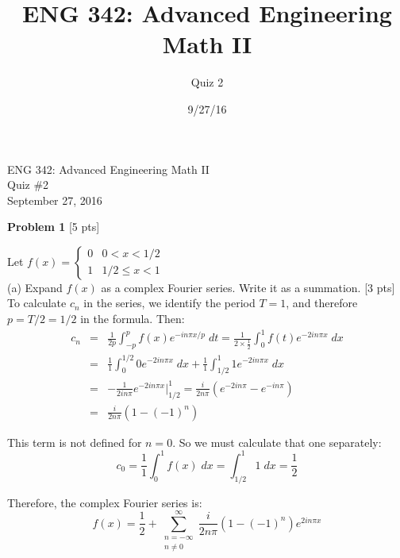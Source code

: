 \documentclass[11pt]{article}
\begin{document}
\title{ENG 342: Advanced Engineering Math II}
\author{Quiz 2}
\date{9/27/16}

{\Large ENG 342: Advanced Engineering Math II} \\

{\large Quiz \#2} \\

September 27, 2016 \\

\newpage

\textbf{Problem 1} [5 pts]

\vspace{0.1in}

Let $f(x) = \begin{cases} 0 & 0 < x <  1/2 \\  1 & 1/2 \leq x < 1 \end{cases}$ \\

(a) Expand $f(x)$ as a complex Fourier series. Write it as a summation. [3 pts] \\

To calculate $c_n$ in the series, we identify the period $T = 1$, and therefore $p = T/2 = 1/2$ in the formula. Then:
\begin{eqnarray*}
c_n &=& \frac{1}{2p} \int_{-p}^{p} f(x) e^{-i n \pi x / p} \; dt = \frac{1}{2 \times \frac{1}{2} } \int_0^1 f(t) e^{-2 i n \pi x} \; dx \\
	&=& \frac{1}{1} \int_0^{1/2} 0 e^{-2 i n \pi x} \; dx + \frac{1}{1} \int_{1/2}^{1} 1 e^{-2 i n \pi x} \; dx \\
	&=& - \frac{1}{2 i n \pi} e^{-2 i n \pi x} \biggr \rvert_{1/2}^1 = \frac{i}{2 n \pi} \left( e^{-2 i n \pi} - e^{-i n \pi} \right) \\
	&=& \frac{i}{2 n \pi} \left( 1 - (-1)^n \right) 
\end{eqnarray*}

This term is not defined for $n = 0$. So we must calculate that one separately:
\begin{equation*}
c_0 = \frac{1}{1} \int_0^1 f(x) \; dx = \int_{1/2}^1 1 \; dx = \frac{1}{2}
\end{equation*}

Therefore, the complex Fourier series is:
\begin{equation*}
f(x) = \frac{1}{2} + \sum_{\substack{n = -\infty \\ n \neq 0}}^{\infty} \frac{i}{2 n \pi} \left( 1 - (-1)^n \right) e^{2 i n \pi x}
\end{equation*}
\end{document}
